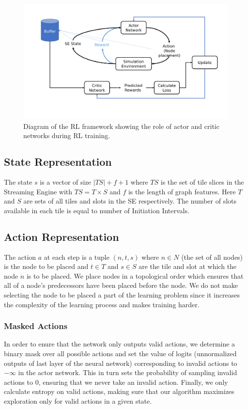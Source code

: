 \begin{figure}[tb]
  \centering
  \includegraphics[trim=15 30 20 20, clip, width=\linewidth]{fig/ppo.pdf}
  \caption{Diagram of the RL framework showing the role of actor and critic networks during RL training. }
  \label{fig:ppo}
\end{figure}

\subsection{State Representation}
The state $s$ is a vector of size $|TS| + f + 1$ where $TS$ is the set of tile slices in the Streaming Engine with $TS=T \times S$ and $f$ is the length of graph features. 
Here $T$ and $S$ are sets of all tiles and slots in the SE respectively. 
The number of slots available in each tile is equal to number of Initiation Intervals.

\subsection{Action Representation}
The action $a$ at each step is a tuple \((n,t,s)\) where $n \in N$ (the set of all nodes) is the node to be placed and $t \in T$ and $s \in S$ are the tile and slot at which the node $n$ is to be placed. 
We place nodes in a topological order which ensures that all of a node's predecessors have been placed before the node. 
We do not make selecting the node to be placed a part of the learning problem since it increases the complexity of the learning process and makes training harder.

\subsubsection{Masked Actions}
In order to enure that the network only outputs valid actions, we determine a binary mask over all possible actions and set the value of logits (unnormalized outputs of last layer of the neural network) corresponding to invalid actions to $-\infty$ in the actor network. 
This in turn sets the probability of sampling invalid actions to $0$, ensuring that we never take an invalid action.
Finally, we only calculate entropy on valid actions, making sure that our algorithm maximizes exploration only for valid actions in a given state.

